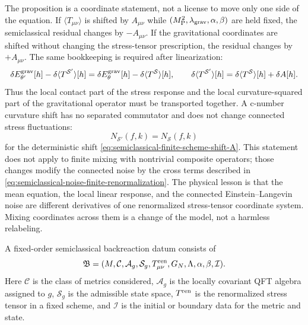 The proposition is a coordinate statement, not a license to move only one side
of the equation.  If
\(\langle T_{\mu\nu}\rangle\) is shifted by \(A_{\mu\nu}\) while
\((M_{\rm P}^2,\lambda_{\rm grav},\alpha,\beta)\) are held fixed, the
semiclassical residual changes by \(-A_{\mu\nu}\).  If the gravitational
coordinates are shifted without changing the stress-tensor prescription, the
residual changes by \(+A_{\mu\nu}\).  The same bookkeeping is required after
linearization:
\begin{equation}
  \delta E_{\theta'}^{\rm grav}[h]
  -
  \delta\langle T^{\mathcal S'}\rangle[h]
  =
  \delta E_{\theta}^{\rm grav}[h]
  -
  \delta\langle T^{\mathcal S}\rangle[h],
  \qquad
  \delta\langle T^{\mathcal S'}\rangle[h]
  =
  \delta\langle T^{\mathcal S}\rangle[h]
  +
  \delta A[h].
  \label{eq:semiclassical-linear-scheme-transport}
\end{equation}
Thus the local contact part of the stress response and the local
curvature-squared part of the gravitational operator must be transported
together.  A c-number curvature shift has no separated commutator and does not
change connected stress fluctuations:
\begin{equation}
  N_{\mathcal S'}(f,k)
  =
  N_{\mathcal S}(f,k)
  \label{eq:semiclassical-cnumber-noise-scheme-invariance}
\end{equation}
for the deterministic shift
\eqref{eq:semiclassical-finite-scheme-shift-A}.  This statement does not apply
to finite mixing with nontrivial composite operators; those changes modify the
connected noise by the cross terms described in
\eqref{eq:semiclassical-noise-finite-renormalization}.  The physical lesson is
that the mean equation, the local linear response, and the connected
Einstein--Langevin noise are different derivatives of one renormalized
stress-tensor coordinate system.  Mixing coordinates across them is a change of
the model, not a harmless relabeling.

\begin{definition}
\label{def:semiclassical-backreaction-datum}
A fixed-order semiclassical backreaction datum consists of
\[
  \mathfrak B
  =
  (M,\mathcal C,\mathcal A_g,\mathcal S_g,
    T_{\mu\nu}^{\rm ren},G_N,\Lambda,\alpha,\beta,\mathcal I).
\]
Here \(\mathcal C\) is the class of metrics considered,
\(\mathcal A_g\) is the locally covariant QFT algebra assigned to \(g\),
\(\mathcal S_g\) is the admissible state space, \(T^{\rm ren}\) is the
renormalized stress tensor in a fixed scheme, and \(\mathcal I\) is the
initial or boundary data for the metric and state.
\end{definition}

